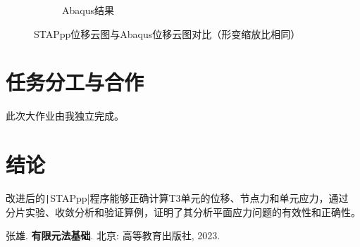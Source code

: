 \documentclass[12pt,a4paper]{article}
\newcommand{\code}{\texttt}
\begin{document}
\begin{figure}[H]
\begin{subfigure}{0.6\textwidth}
        \caption{Abaqus结果}
        \label{fig:subfig2}
    \end{subfigure}
    \caption{STAPpp位移云图与Abaqus位移云图对比（形变缩放比相同）}
\end{figure}

\section{任务分工与合作}
此次大作业由我独立完成。

\section{结论}
改进后的\code|STAPpp|程序能够正确计算T3单元的位移、节点力和单元应力，通过
分片实验、收敛分析和验证算例，证明了其分析平面应力问题的有效性和正确性。

\begin{thebibliography}{99}  %
张雄. 
\textbf{有限元法基础}. 
北京: 高等教育出版社, 2023.
\end{thebibliography}
\end{document}
